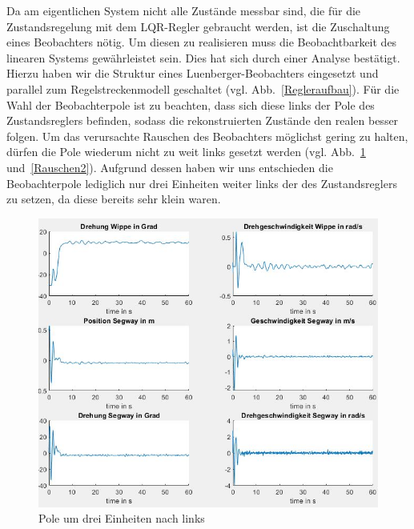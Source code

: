 \documentclass[pdf]{ifacconf}
\begin{document}
	Da am eigentlichen System nicht alle Zustände messbar sind, die für die Zustandsregelung 			mit dem LQR-Regler gebraucht werden, ist die Zuschaltung eines Beobachters nötig.
	Um diesen zu realisieren muss die Beobachtbarkeit des linearen Systems gewährleistet sein.
	Dies hat sich durch einer Analyse bestätigt.
	Hierzu haben wir die Struktur eines Luenberger-Beobachters eingesetzt und parallel zum            	Regelstreckenmodell geschaltet (vgl. Abb.~\ref{Regleraufbau}). Für die Wahl der Beobachterpole ist zu beachten, dass sich diese links der Pole des Zustandsreglers befinden, sodass die rekonstruierten Zustände den realen besser folgen. Um das verursachte Rauschen des Beobachters möglichst gering zu halten, dürfen die Pole wiederum nicht zu weit links gesetzt werden (vgl. Abb.~\ref{Rauschen1} und~\ref{Rauschen2}). Aufgrund dessen haben wir uns entschieden die Beobachterpole lediglich nur drei Einheiten weiter links der des Zustandsreglers zu setzen, da diese bereits sehr klein waren. 
	
	
	\begin{figure}[h]	
\centerline{\includegraphics[width=\linewidth]{Bilder/Regler1.jpg}}
	\label{Rauschen1}
	\caption{Pole um drei Einheiten nach links}
\end{figure}
\end{document}

